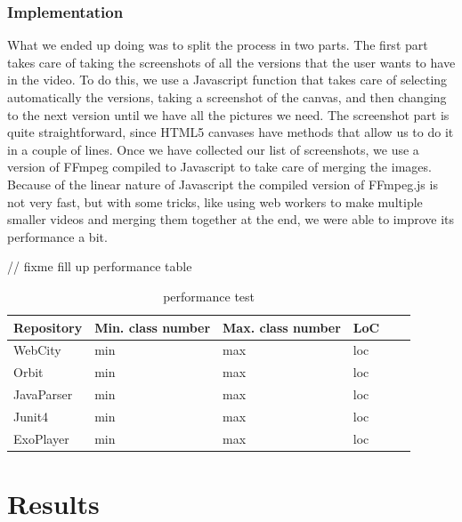 \documentclass[]{usiinfbachelorproject}
\begin{document}
\subsubsection{Implementation} \label{Implementation}

What we ended up doing was to split the process in two parts.
The first part takes care of taking the screenshots of all the versions that the user wants to have in the video. To do this, we use a Javascript function that takes care of selecting automatically the versions, taking a screenshot of the canvas, and then changing to the next version until we have all the pictures we need. The screenshot part is quite straightforward, since HTML5 canvases have methods that allow us to do it in a couple of lines.
Once we have collected our list of screenshots, we use a version of FFmpeg compiled to Javascript to take care of merging the images. Because of the linear nature of Javascript the compiled version of FFmpeg.js is not very fast, but with some tricks, like using web workers to make multiple smaller videos and merging them together at the end, we were able to improve its performance a bit.

// fixme fill up performance table
\begin{table}[H]
    \begin{center}
        \begin{tabular}{ | l | l | l | l | l | l |}
        \hline
        Repository & Min. class number & Max. class number & LoC \\ \hline
        WebCity & min & max & loc \\ \hline
        Orbit & min & max & loc \\ \hline
        JavaParser & min & max & loc \\ \hline
        Junit4 & min & max & loc \\ \hline
        ExoPlayer & min & max & loc \\ \hline
        \end{tabular}
    \end{center}
    \caption{performance test}
    \label{tab:performance}
\end{table}






\section{Results} \label{Results}
\end{document}
